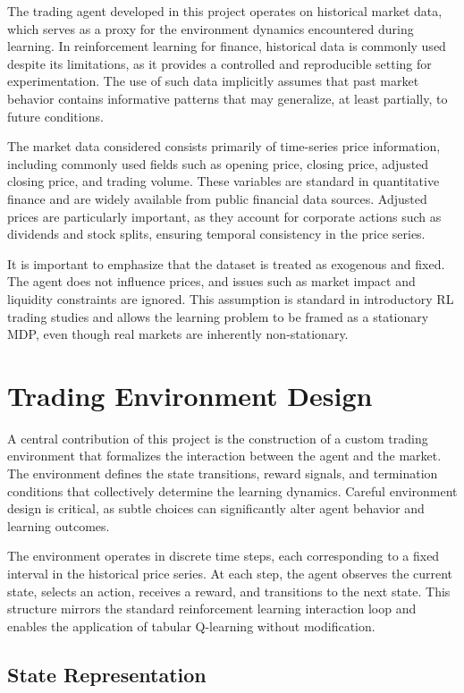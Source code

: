 \documentclass[12pt]{report}
\begin{document}
The trading agent developed in this project operates on historical market data, which serves as a proxy for the environment dynamics encountered during learning. In reinforcement learning for finance, historical data is commonly used despite its limitations, as it provides a controlled and reproducible setting for experimentation. The use of such data implicitly assumes that past market behavior contains informative patterns that may generalize, at least partially, to future conditions.

The market data considered consists primarily of time-series price information, including commonly used fields such as opening price, closing price, adjusted closing price, and trading volume. These variables are standard in quantitative finance and are widely available from public financial data sources. Adjusted prices are particularly important, as they account for corporate actions such as dividends and stock splits, ensuring temporal consistency in the price series.

It is important to emphasize that the dataset is treated as exogenous and fixed. The agent does not influence prices, and issues such as market impact and liquidity constraints are ignored. This assumption is standard in introductory RL trading studies and allows the learning problem to be framed as a stationary MDP, even though real markets are inherently non-stationary.

\chapter{Trading Environment Design}

A central contribution of this project is the construction of a custom trading environment that formalizes the interaction between the agent and the market. The environment defines the state transitions, reward signals, and termination conditions that collectively determine the learning dynamics. Careful environment design is critical, as subtle choices can significantly alter agent behavior and learning outcomes.

The environment operates in discrete time steps, each corresponding to a fixed interval in the historical price series. At each step, the agent observes the current state, selects an action, receives a reward, and transitions to the next state. This structure mirrors the standard reinforcement learning interaction loop and enables the application of tabular Q-learning without modification.

\section{State Representation}
\end{document}
